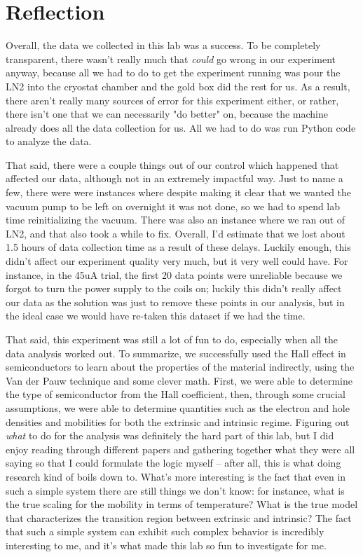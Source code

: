 \documentclass[10pt]{article}
\begin{document}
	\section{Reflection}
	Overall, the data we collected in this lab was a success. To be completely transparent, there wasn't
	really much that \textit{could} go wrong in our experiment anyway, because all we had to do to get the
	experiment running was pour the LN2 into the cryostat chamber and the gold box did the rest for us. As a
	result, there aren't really many sources of error for this experiment either, or rather, there isn't
	one that we can necessarily "do better" on, because the machine already does all the data collection for
	us. All we had to do was run Python code to analyze the data.    

	That said, there were a couple things out of our control which happened that affected our data, although
	not in an extremely impactful way. Just to name a few, there were were instances where despite
	making it clear that we wanted the vacuum pump to be left on overnight it was not done, so we had to
	spend lab time reinitializing the vacuum. There was also an instance where we ran out of LN2, and that
	also took a while to fix. Overall, I'd estimate that we lost about 1.5 hours of data collection time as a
	result of these delays. Luckily enough, this didn't affect our experiment quality very much, but it very
	well could have. For instance, in the 45uA trial, the first 20 data points were unreliable 
	because we forgot to turn the power supply to the coils on; luckily this didn't really affect our data as
	the solution was just to remove these points in our analysis, but in the ideal case we would have
	re-taken this dataset if we had the time. 

	That said, this experiment was still a lot of fun to do, especially when all the data analysis worked
	out. To summarize, we successfully used the Hall effect in semiconductors to learn about the properties
	of the material indirectly, using the Van der Pauw technique and some clever math. First, we were able to
	determine the type of semiconductor from the Hall coefficient, then, through some crucial assumptions, 
	we were able to determine quantities
	such as the electron and hole densities and mobilities for both the extrinsic and intrinsic regime.
	Figuring out \textit{what} to do for the analysis was definitely the hard part of this lab, but I did
	enjoy reading through different papers and gathering together what they were all saying so that I could
	formulate the logic myself -- after all, this is what doing research kind of boils down to. What's more
	interesting is the fact that even in such a simple system there are still things we don't know: for
	instance, what is the true scaling for the mobility in terms of temperature? What is the true model that
	characterizes the transition region between extrinsic and intrinsic? The fact that such a simple system
	can exhibit such complex behavior is incredibly interesting to me, and it's what made this lab so fun to
	investigate for me. 
\end{document}
